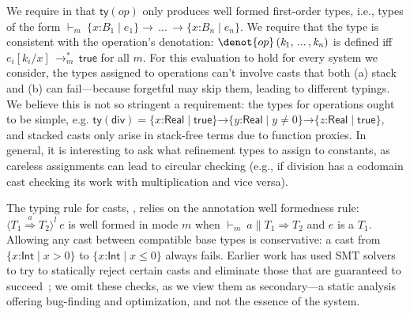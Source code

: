 \documentclass[9pt]{extarticle}
\newcommand{\ottnt}[1]{\mathit{#1}}
\newcommand{\ottmv}[1]{\mathit{#1}}
\newcommand{\ottsym}[1]{#1}
\begin{document}
We require in  that $ \mathsf{ty} (\mathord{ \ottnt{op} }) $ only produces well formed first-order
types, i.e., types of the form $ \mathord{  \vdash _{ \ottnt{m} } }~ {}   \{ \mathit{x} \mathord{:} \ottnt{B_{{\mathrm{1}}}} \mathrel{\mid} \ottnt{e_{{\mathrm{1}}}} \}   \rightarrow \, ... \, \rightarrow   \{ \mathit{x} \mathord{:} \ottnt{B_{\ottmv{n}}} \mathrel{\mid} \ottnt{e_{\ottmv{n}}} \}   {} $. We require that the type is consistent with the operation's
denotation: $\denot{ op } \, \ottsym{(}  \ottnt{k_{{\mathrm{1}}}}  \ottsym{,} \, ... \, \ottsym{,}  \ottnt{k_{\ottmv{n}}}  \ottsym{)}$ is defined iff $ \ottnt{e_{\ottmv{i}}}  [  \ottnt{k_{\ottmv{i}}} / \mathit{x}  ]  \,  \longrightarrow ^{*}_{ \ottnt{m} }  \,  \mathsf{true} $ for all $\ottnt{m}$.
For this evaluation to hold for every system we consider, the types
assigned to operations can't involve casts that both (a) stack and (b)
can fail\iffull---because forgetful \lambdah may skip them, leading to
different typings\fi. We believe this is not so stringent a requirement:
the types for operations ought to be simple, e.g. $ \mathsf{ty} (\mathord{  \mathsf{div}  })  =
   \{ \mathit{x} \mathord{:}  \mathsf{Real}  \mathrel{\mid}  \mathsf{true}  \}  \mathord{ \rightarrow }  \{ \mathit{y} \mathord{:}  \mathsf{Real}  \mathrel{\mid}  \mathit{y}  \mathrel{\ne}  \ottsym{0}  \}   \mathord{ \rightarrow }  \{ \mathit{z} \mathord{:}  \mathsf{Real}  \mathrel{\mid}  \mathsf{true}  \}  $, and stacked casts
only arise in stack-free terms due to function proxies.
In general, it is interesting to ask what refinement types to assign
to constants, as careless assignments can lead to circular checking
(e.g., if division has a codomain cast checking its work with
multiplication and vice versa).

The typing rule for casts, , relies on the annotation well
formedness rule: $ \langle  \ottnt{T_{{\mathrm{1}}}}  \mathord{ \overset{ \ottnt{a} }{\Rightarrow} }  \ottnt{T_{{\mathrm{2}}}}  \rangle^{ \ottnt{l} } ~  \ottnt{e} $ is well formed in mode $\ottnt{m}$
when $ \mathord{  \vdash _{ \ottnt{m} } }~ \ottnt{a}   \mathrel{\parallel}   \ottnt{T_{{\mathrm{1}}}}  \Rightarrow  \ottnt{T_{{\mathrm{2}}}} $ and $\ottnt{e}$ is a $\ottnt{T_{{\mathrm{1}}}}$.
Allowing any cast between compatible base types is conservative: a
cast from $ \{ \mathit{x} \mathord{:}  \mathsf{Int}  \mathrel{\mid}  \mathit{x}  \mathrel{>} \ottsym{0}  \} $ to $ \{ \mathit{x} \mathord{:}  \mathsf{Int}  \mathrel{\mid}  \mathit{x}  \mathrel{\le}  \ottsym{0}  \} $ always
fails. Earlier work has used SMT solvers to try to statically reject
certain casts and eliminate those that are guaranteed to
succeed~\cite{Flanagan06hybrid,Knowles06sage,Bierman10smt}; we omit
these checks, as we view them as secondary---a static analysis
offering bug-finding and optimization, and not the essence of the
system.
\end{document}
